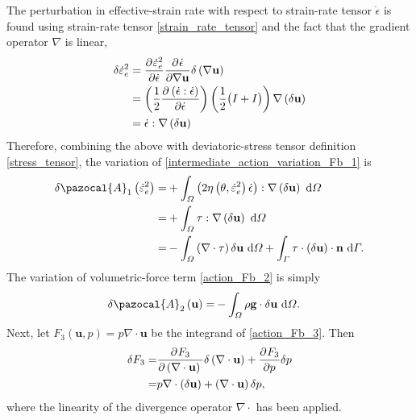 The perturbation in effective-strain rate with respect to strain-rate tensor $\dot{\epsilon}$ is found using strain-rate tensor \cref{strain_rate_tensor} and the fact that the gradient operator $\nabla$ is linear,
\begin{align*}
  \delta \dot{\varepsilon}_e^2 &= \frac{\partial{^{}} \dot{\varepsilon}_e^2}{\partial \dot{\epsilon}{^{}} } \frac{\partial{^{}} \dot{\epsilon}}{\partial \nabla \mathbf{u}{^{}} } \delta \left( \nabla \mathbf{u} \right) \\
   &= \left( \frac{1}{2} \frac{\partial{^{}}  \left( \dot{\epsilon} : \dot{\epsilon} \right) }{\partial \dot{\epsilon}{^{}} } \right) \left( \frac{1}{2} \big( I + I \big) \right) \nabla \left( \delta \mathbf{u} \right) \\
   &= \dot{\epsilon} : \nabla \left( \delta \mathbf{u} \right)
\end{align*}
Therefore, combining the above with deviatoric-stress tensor definition \cref{stress_tensor}, the variation of \cref{intermediate_action_variation_Fb_1} is
\begin{align}
  \delta \pazocal{A}_1 \left( \dot{\varepsilon}_e^2 \right) = &+ \int_{\Omega} \left( 2 \eta \left( \theta, \dot{\varepsilon}_e^2 \right) \dot{\epsilon} \right) : \nabla \left( \delta \mathbf{u} \right) \d{\Omega} \notag \\
  = &+ \int_{\Omega} \tau : \nabla \left( \delta \mathbf{u} \right) \d{\Omega} \notag \\
  \label{action_variation_Fb_1}
  = &- \int_{\Omega} \left( \nabla \cdot \tau \right) \delta \mathbf{u} \d{\Omega} + \int_{\Gamma} \tau \cdot \left( \delta \mathbf{u} \right) \cdot \mathbf{n} \d{\Gamma}.
\end{align}
The variation of volumetric-force term \cref{action_Fb_2} is simply
\begin{align}
  \label{action_variation_Fb_2}
  \delta \pazocal{A}_2 \left(\mathbf{u} \right) = &- \int_{\Omega} \rho \mathbf{g} \cdot \delta \mathbf{u} \d{\Omega}.
\end{align}
Next, let $F_3\left( \mathbf{u}, p \right) = p \nabla \cdot \mathbf{u}$ be the integrand of \cref{action_Fb_3}.
Then
\begin{align*}
  \delta F_3 =& \frac{\partial{^{}} F_3}{\partial \left( \nabla \cdot \mathbf{u} \right){^{}} } \delta \left( \nabla \cdot \mathbf{u} \right) + \frac{\partial{^{}} F_3}{\partial p{^{}} } \delta p \\ 
  =& p \nabla \cdot \left( \delta \mathbf{u} \right) + \left( \nabla \cdot \mathbf{u} \right) \delta p,
\end{align*}
where the linearity of the divergence operator $\nabla \cdot$ has been applied.
